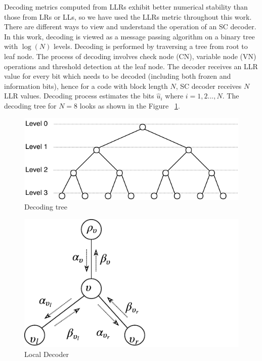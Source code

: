 Decoding metrics computed from LLRs exhibit better numerical stability than those from LRs or LLs, so we have used the LLRs metric throughout this work. There are different ways to view and understand the operation of an SC decoder. In this work, decoding is viewed as a message passing algorithm on a binary tree with $\log(N)$ levels. Decoding is performed by traversing a tree from root to leaf node. The process of decoding involves check node (CN), variable node (VN) operations and threshold detection at the leaf node. The decoder receives an LLR value for every bit which needs to be decoded (including both frozen and information bits), hence for a code with block length $N$, SC decoder receives $N$ LLR values. Decoding process estimates the bits $\hat{u}_{i} $  where $i = 1,2...,N$. The decoding tree for $N = 8$ looks as shown in the Figure ~\ref{fig:decodingTree}.

\begin{figure}[h]
	\centering
	\includegraphics{./figures/decodingTree.pdf}
	\caption{Decoding tree}
	\label{fig:decodingTree}
\end{figure}

\begin{figure}[h]
	\centering
	\includegraphics{./figures/messagePassingDiaS.pdf}
	\caption{Local Decoder}
	\label{fig:msgPassingDia}
\end{figure}

